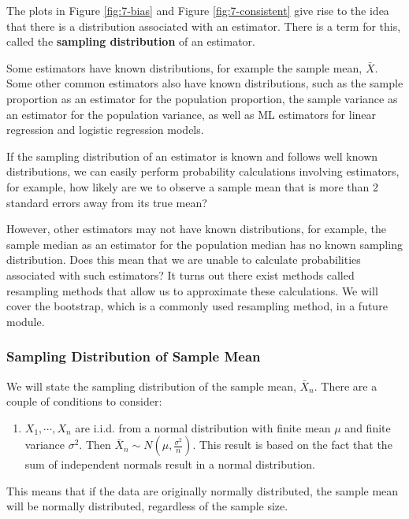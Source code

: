 \documentclass[
]{book}
\providecommand{\tightlist}{%
  \setlength{\itemsep}{0pt}\setlength{\parskip}{0pt}}
\begin{document}
The plots in Figure \ref{fig:7-bias} and Figure \ref{fig:7-consistent} give rise to the idea that there is a distribution associated with an estimator. There is a term for this, called the \textbf{sampling distribution} of an estimator.

Some estimators have known distributions, for example the sample mean, \(\bar{X}\). Some other common estimators also have known distributions, such as the sample proportion as an estimator for the population proportion, the sample variance as an estimator for the population variance, as well as ML estimators for linear regression and logistic regression models.

If the sampling distribution of an estimator is known and follows well known distributions, we can easily perform probability calculations involving estimators, for example, how likely are we to observe a sample mean that is more than 2 standard errors away from its true mean?

However, other estimators may not have known distributions, for example, the sample median as an estimator for the population median has no known sampling distribution. Does this mean that we are unable to calculate probabilities associated with such estimators? It turns out there exist methods called resampling methods that allow us to approximate these calculations. We will cover the bootstrap, which is a commonly used resampling method, in a future module.

\subsubsection{Sampling Distribution of Sample Mean}\label{sampdistmean}

We will state the sampling distribution of the sample mean, \(\bar{X}_n\). There are a couple of conditions to consider:

\begin{enumerate}
\def\labelenumi{\arabic{enumi}.}
\tightlist
\item
  \(X_1, \cdots, X_n\) are i.i.d. from a normal distribution with finite mean \(\mu\) and finite variance \(\sigma^2\). Then \(\bar{X}_n \sim N(\mu, \frac{\sigma^2}{n})\). This result is based on the fact that the sum of independent normals result in a normal distribution.
\end{enumerate}

This means that if the data are originally normally distributed, the sample mean will be normally distributed, regardless of the sample size.
\end{document}

